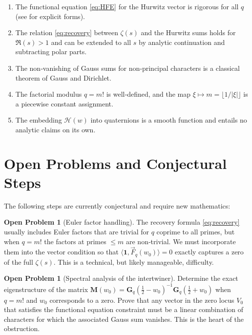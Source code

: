 \documentclass{article}
\theoremstyle{definition}
\newtheorem{problem}[theorem]{Open Problem}
\begin{document}
\begin{enumerate}
    \item The functional equation \eqref{eq:HFE} for the Hurwitz vector is rigorous for all \(q\) (see \cite{LangSC} for explicit forms).
    \item The relation \eqref{eq:recovery} between \(\zeta(s)\) and the Hurwitz sums holds for \(\Re(s)>1\) and can be extended to all \(s\) by analytic continuation and subtracting polar parts.
    \item The non‑vanishing of Gauss sums for non‑principal characters is a classical theorem of Gauss and Dirichlet.
    \item The factorial modulus \(q=m!\) is well‑defined, and the map \(\xi \mapsto m = \lfloor 1/|\xi|\rfloor\) is a piecewise constant assignment.
    \item The embedding \(\mathcal{H}(w)\) into quaternions is a smooth function and entails no analytic claims on its own.
\end{enumerate}

\section{Open Problems and Conjectural Steps}

The following steps are currently conjectural and require new mathematics:

\begin{problem}[Euler factor handling]
The recovery formula \eqref{eq:recovery} usually includes Euler factors that are trivial for \(q\) coprime to all primes, but when \(q=m!\) the factors at primes \(\le m\) are non‑trivial. We must incorporate them into the vector condition so that \(\langle \mathbf{1}, \vec{F}_q(w_0) \rangle = 0\) exactly captures a zero of the full \(\zeta(s)\). This is a technical, but likely manageable, difficulty.
\end{problem}

\begin{problem}[Spectral analysis of the intertwiner]
Determine the exact eigenstructure of the matrix \(\mathbf{M}(w_0) = \mathbf{G}_q(\tfrac12 - w_0)^{-1}\mathbf{G}_q(\tfrac12 + w_0)\) when \(q=m!\) and \(w_0\) corresponds to a zero. Prove that any vector in the zero locus \(V_0\) that satisfies the functional equation constraint must be a linear combination of characters for which the associated Gauss sum vanishes. This is the heart of the obstruction.
\end{problem}
\end{document}
